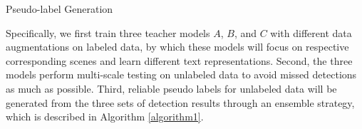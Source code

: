 \begin{algorithm}
\caption{Pseudo-label Generation} 
\label{algorithm1}
\end{algorithm}

Specifically, we first train three teacher models $A$, $B$, and $C$ with different data augmentations on labeled data, by which these models will focus on respective corresponding scenes and learn different text representations. Second, the three models perform multi-scale testing on unlabeled data to avoid missed detections as much as possible. Third, reliable pseudo labels for unlabeled data will be generated from the three sets of detection results through an ensemble strategy, which is described in Algorithm \ref{algorithm1}.

